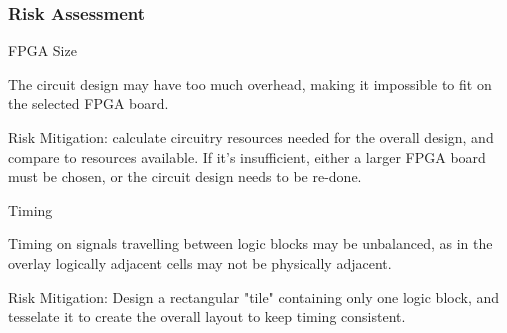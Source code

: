 \subsubsection{Risk Assessment}

\begin{itemlist}
	\item FPGA Size \
		\begin{itemlist}
			\item The circuit design may have too much overhead, making it impossible to fit on the selected FPGA board.
			\item Risk Mitigation: calculate circuitry resources needed for the overall design, and compare to resources available.
If it's insufficient, either a larger FPGA board must be chosen, or the circuit design needs to be re-done.
		\end{itemlist}
	\item Timing \
		\begin{itemlist}
			\item Timing on signals travelling between logic blocks may be unbalanced, as in the overlay logically adjacent cells may not be physically adjacent.
			\item Risk Mitigation: Design a rectangular "tile" containing only one logic block, and tesselate it to create the overall layout to keep timing consistent.
		\end{itemlist}
\end{itemlist}

